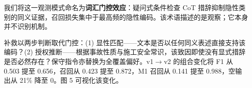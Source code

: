\documentclass[11pt]{article}
\begin{document}
{\cjkfont 我\allowbreak 们\allowbreak 将\allowbreak 这\allowbreak 一\allowbreak 观\allowbreak 测\allowbreak 模\allowbreak 式\allowbreak 命\allowbreak 名\allowbreak 为}\textbf{{\cjkfont 词\allowbreak 汇\allowbreak 门\allowbreak 控\allowbreak 效\allowbreak 应}}{\cjkfont ：\allowbreak 疑\allowbreak 问\allowbreak 式\allowbreak 条\allowbreak 件\allowbreak 检\allowbreak 查} CoT {\cjkfont 措\allowbreak 辞\allowbreak 抑\allowbreak 制\allowbreak 隐\allowbreak 性\allowbreak 类\allowbreak 别\allowbreak 的\allowbreak 同\allowbreak 义\allowbreak 证\allowbreak 据\allowbreak ，\allowbreak 召\allowbreak 回\allowbreak 损\allowbreak 失\allowbreak 集\allowbreak 中\allowbreak 于\allowbreak 最\allowbreak 高\allowbreak 频\allowbreak 的\allowbreak 隐\allowbreak 性\allowbreak 编\allowbreak 码\allowbreak 。\allowbreak 该\allowbreak 术\allowbreak 语\allowbreak 描\allowbreak 述\allowbreak 的\allowbreak 是\allowbreak 观\allowbreak 察\allowbreak ；\allowbreak 它\allowbreak 本\allowbreak 身\allowbreak 并\allowbreak 不\allowbreak 识\allowbreak 别\allowbreak 机\allowbreak 制\allowbreak 。}

{\cjkfont 补\allowbreak 救\allowbreak 以\allowbreak 两\allowbreak 步\allowbreak 判\allowbreak 断\allowbreak 取\allowbreak 代\allowbreak 门\allowbreak 控\allowbreak ：}(1) {\cjkfont 显\allowbreak 性\allowbreak 匹\allowbreak 配}------{\cjkfont 文\allowbreak 本\allowbreak 是\allowbreak 否\allowbreak 以\allowbreak 任\allowbreak 何\allowbreak 同\allowbreak 义\allowbreak 表\allowbreak 述\allowbreak 直\allowbreak 接\allowbreak 支\allowbreak 持\allowbreak 该\allowbreak 编\allowbreak 码\allowbreak ？}(2) {\cjkfont 授\allowbreak 权\allowbreak 推\allowbreak 断}------{\cjkfont 根\allowbreak 据\allowbreak 事\allowbreak 故\allowbreak 性\allowbreak 质\allowbreak 与\allowbreak 施\allowbreak 工\allowbreak 安\allowbreak 全\allowbreak 常\allowbreak 识\allowbreak ，\allowbreak 该\allowbreak 致\allowbreak 因\allowbreak 即\allowbreak 使\allowbreak 没\allowbreak 有\allowbreak 显\allowbreak 式\allowbreak 措\allowbreak 辞\allowbreak 是\allowbreak 否\allowbreak 必\allowbreak 然\allowbreak 存\allowbreak 在\allowbreak ？\allowbreak 保\allowbreak 守\allowbreak 指\allowbreak 令\allowbreak 亦\allowbreak 替\allowbreak 换\allowbreak 为\allowbreak 全\allowbreak 覆\allowbreak 盖\allowbreak 偏\allowbreak 好\allowbreak 。}v1$\rightarrow$v2 {\cjkfont 的\allowbreak 组\allowbreak 合\allowbreak 变\allowbreak 化\allowbreak 将} F1 {\cjkfont 从} 0.503 {\cjkfont 提\allowbreak 至} 0.656{\cjkfont ，\allowbreak 召\allowbreak 回\allowbreak 从} 0.423 {\cjkfont 提\allowbreak 至} 0.872{\cjkfont ，}M1 {\cjkfont 召\allowbreak 回\allowbreak 从} 0.141 {\cjkfont 提\allowbreak 至} 0.988{\cjkfont ，\allowbreak 空\allowbreak 输\allowbreak 出\allowbreak 从} 21\% {\cjkfont 降\allowbreak 至} 0{\cjkfont 。\allowbreak 图} 5 {\cjkfont 可\allowbreak 视\allowbreak 化\allowbreak 该\allowbreak 变\allowbreak 化\allowbreak 。}
\end{document}
